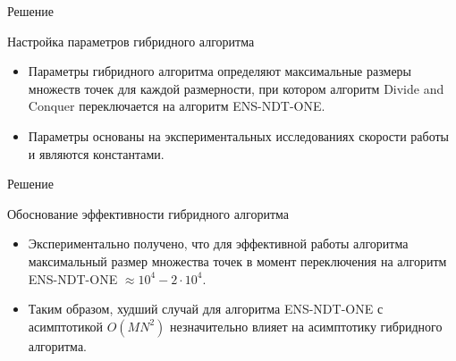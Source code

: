 \documentclass[table]{beamer}
\begin{document}
\begin{frame}{Решение}
\begin{block}{Настройка параметров гибридного алгоритма}
\begin{itemize}
\item Параметры гибридного алгоритма определяют максимальные размеры множеств точек для каждой размерности, при котором алгоритм Divide and Conquer переключается на алгоритм ENS-NDT-ONE.
\item Параметры основаны на экспериментальных исследованиях скорости работы и являются константами.
\end{itemize}
\end{block}
\end{frame}

\begin{frame}{Решение}
\begin{block}{Обоснование эффективности гибридного алгоритма}
\begin{itemize}
\item Экспериментально получено, что для эффективной работы алгоритма максимальный размер множества точек в момент переключения на алгоритм ENS-NDT-ONE $\approx 10^4 - 2 \cdot 10^4$.
\item Таким образом, худший случай для алгоритма ENS-NDT-ONE с асимптотикой $O(MN^2)$ незначительно влияет на асимптотику гибридного алгоритма.
\end{itemize}
\end{block}
\end{frame}
\end{document}
